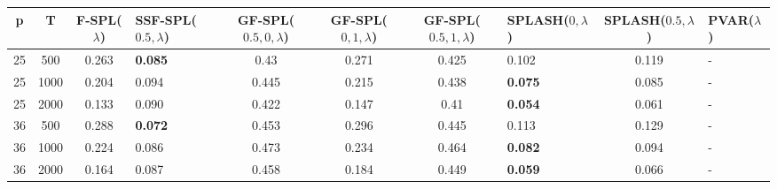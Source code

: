 \begin{tabular}{ccclccclcl}
\hline
  p  &  T   &  F-SPL($\lambda$)  & SSF-SPL($0.5, \lambda$)   &  GF-SPL($0.5, 0, \lambda$)  &  GF-SPL($0, 1, \lambda$)  &  GF-SPL($0.5, 1, \lambda$)  & SPLASH($0, \lambda$)   &  SPLASH($0.5, \lambda$)  & PVAR($\lambda$)   \\
\hline
 25  & 500  &       0.263        & \textbf{0.085}            &            0.43             &           0.271           &            0.425            & 0.102                  &          0.119           & -                 \\
 25  & 1000 &       0.204        & 0.094                     &            0.445            &           0.215           &            0.438            & \textbf{0.075}         &          0.085           & -                 \\
 25  & 2000 &       0.133        & 0.090                     &            0.422            &           0.147           &            0.41             & \textbf{0.054}         &          0.061           & -                 \\
 36  & 500  &       0.288        & \textbf{0.072}            &            0.453            &           0.296           &            0.445            & 0.113                  &          0.129           & -                 \\
 36  & 1000 &       0.224        & 0.086                     &            0.473            &           0.234           &            0.464            & \textbf{0.082}         &          0.094           & -                 \\
 36  & 2000 &       0.164        & 0.087                     &            0.458            &           0.184           &            0.449            & \textbf{0.059}         &          0.066           & -                 \\
\hline
\end{tabular}